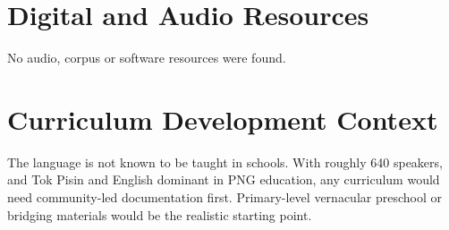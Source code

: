 \documentclass[12pt]{article}
\begin{document}
\section{Digital and Audio Resources}
No audio, corpus or software resources were found.

\section{Curriculum Development Context}
The language is not known to be taught in schools. With roughly 640 speakers, and Tok Pisin and English dominant in PNG education, any curriculum would need community-led documentation first. Primary-level vernacular preschool or bridging materials would be the realistic starting point.
\end{document}
